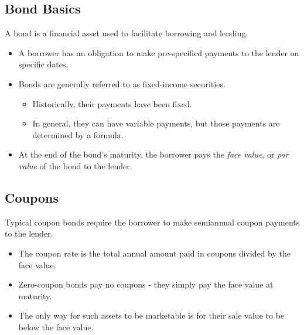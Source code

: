\documentclass[letterpaper,10pt,english]{sphinxmanual}
\begin{document}
\subsection{Bond Basics}
\label{bondPrices:bond-basics}
A bond is a financial asset used to facilitate borrowing and lending.
\begin{itemize}
\item {} 
A borrower has an obligation to make pre-specified payments to the
lender on specific dates.

\end{itemize}
\begin{itemize}
\item {} 
Bonds are generally referred to as fixed-income securities.
\begin{itemize}
\item {} 
Historically, their payments have been  fixed.

\end{itemize}
\begin{itemize}
\item {} 
In general, they can have variable payments, but those payments
are determined by a formula.

\end{itemize}

\end{itemize}
\begin{itemize}
\item {} 
At the end of the bond's maturity, the borrower pays the \emph{face
value}, or \emph{par value} of the bond to the lender.

\end{itemize}


\subsection{Coupons}
\label{bondPrices:coupons}
Typical coupon bonds require the borrower to make semiannual coupon
payments to the lender.
\begin{itemize}
\item {} 
The coupon rate is the total annual amount paid in coupons divided
by the face value.

\end{itemize}
\begin{itemize}
\item {} 
Zero-coupon bonds pay no coupons - they simply pay the face value at
maturity.

\end{itemize}
\begin{itemize}
\item {} 
The only way for such assets to be marketable is for their sale
value to be below the face value.

\end{itemize}
\end{document}
